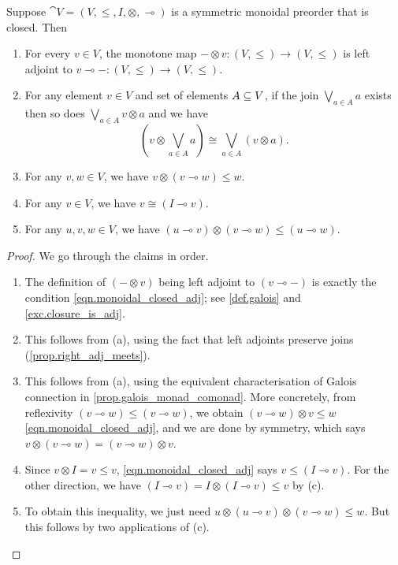 \documentclass[7Sketches]{subfiles}
\begin{document}
\begin{proposition}%
\label{prop.properties_closed_mon_preorders}
Suppose $\cat{V}=(V,\leq,I,\otimes,\multimap)$ is a symmetric monoidal preorder that is closed. Then
\begin{enumerate}[label=(\alph*)]
	\item For every $v\in V$, the monotone map $-\otimes v\colon (V,\leq)\to(V,\leq)$ is left adjoint to $v\multimap-\colon (V,\leq)\to(V,\leq)$. 
	\item For any element $v\in V$ and set of elements $A\ss V$, if the join $\bigvee_{a\in A}a$ exists then so does $\bigvee_{a\in A}v\otimes a$ and we have 
	\begin{equation}%
\label{eqn.monprod_distributes_joins}
		\left(v\otimes\bigvee_{a\in A}a\right)\cong\bigvee_{a\in A}(v\otimes a).
	\end{equation}
	\item For any $v,w\in V$, we have $v\otimes(v\multimap w)\leq w$.
	\item For any $v\in V$, we have $v\cong(I\multimap v)$.
	\item For any $u,v,w\in V$, we have $(u\multimap v)\otimes(v\multimap w)\leq(u\multimap w)$.
\end{enumerate}
\end{proposition}
\begin{proof}
We go through the claims in order.
\begin{enumerate}[label=(\alph*)]
	\item The definition of $(-\otimes v)$ being left adjoint to
	$(v\multimap -)$ is exactly the condition
	\cref{eqn.monoidal_closed_adj}; see \cref{def.galois} and
	\cref{exc.closure_is_adj}.
	\item This follows from (a), using the fact that left adjoints preserve
	  joins (\cref{prop.right_adj_meets}).
	\item This follows from (a), using the equivalent characterisation of
	  Galois connection in \cref{prop.galois_monad_comonad}. More
	  concretely, from reflexivity $(v\multimap w)\leq(v\multimap w)$, we
	  obtain $(v\multimap w)\otimes v\leq w$ \cref{eqn.monoidal_closed_adj},
	  and we are done by symmetry, which says $v\otimes(v\multimap
	  w)=(v\multimap w)\otimes v$. 
	\item Since $v\otimes I=v\leq v$, \cref{eqn.monoidal_closed_adj} says
	  $v\leq (I\multimap v)$. For the other direction, we have $(I\multimap
	  v)=I\otimes(I\multimap v)\leq v$ by (c).
	\item To obtain this inequality, we just need $u\otimes(u\multimap
	  v)\otimes(v\multimap w)\leq w$. But this follows by two applications
	  of (c).
	  \qedhere
\end{enumerate}
\end{proof}
\end{document}
